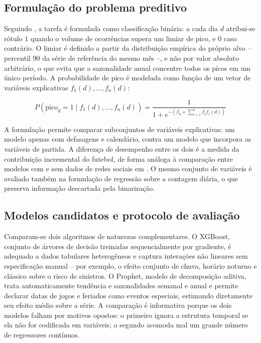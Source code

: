 \documentclass[12pt]{article}
\begin{document}
\subsection{Formulação do problema preditivo}

Seguindo \cite{ristea2020}, a tarefa é formulada como classificação binária: a
cada dia $d$ atribui-se rótulo $1$ quando o volume de ocorrências supera um
limiar de pico, e $0$ caso contrário. O limiar é definido a partir da
distribuição empírica do próprio alvo -- percentil 90 da série de referência do
mesmo mês --, e não por valor absoluto arbitrário, o que evita que a
sazonalidade anual concentre todos os picos em um único período. A
probabilidade de pico é modelada como função de um vetor de variáveis
explicativas $f_1(d), \ldots, f_n(d)$:

\begin{equation}
P(\text{pico}_d = 1 \mid f_1(d), \ldots, f_n(d)) =
\frac{1}{1 + e^{-(\beta_0 + \sum_{i=1}^{n}\beta_i f_i(d))}}
\end{equation}

A formulação permite comparar subconjuntos de variáveis explicativas: um
modelo apenas com defasagens e calendário, contra um modelo que incorpora as
variáveis de partida. A diferença de desempenho entre os dois é a medida da
contribuição incremental do futebol, de forma análoga à comparação entre
modelos com e sem dados de redes sociais em \cite{ristea2020}. O mesmo conjunto
de variáveis é avaliado também na formulação de regressão sobre a contagem
diária, o que preserva informação descartada pela binarização.

\subsection{Modelos candidatos e protocolo de avaliação}

Comparam-se dois algoritmos de naturezas complementares. O XGBoost, conjunto de
árvores de decisão treinadas sequencialmente por gradiente, é adequado a dados
tabulares heterogêneos e captura interações não lineares sem especificação
manual -- por exemplo, o efeito conjunto de chuva, horário noturno e clássico
sobre o risco de sinistros. O Prophet, modelo de decomposição aditiva, trata
automaticamente tendência e sazonalidades semanal e anual e permite declarar
datas de jogos e feriados como eventos especiais, estimando diretamente seu
efeito médio sobre a série. A comparação é informativa porque os dois modelos
falham por motivos opostos: o primeiro ignora a estrutura temporal se ela não
for codificada em variáveis; o segundo acomoda mal um grande número de
regressores contínuos.
\end{document}
